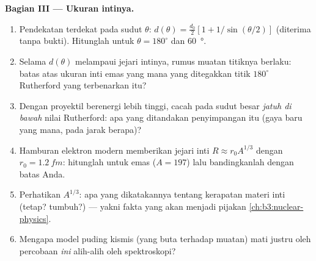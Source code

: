 \begin{problem}
\medskip\noindent\textbf{Bagian III --- Ukuran intinya.}
\begin{enumerate}[resume]
  \item Pendekatan terdekat pada sudut $\theta$: $d(\theta) =
        \tfrac{d_0}2[1 + 1/\sin(\theta/2)]$ (diterima tanpa bukti).
        Hitunglah untuk $\theta = 180^\circ$ dan \qty{60}{\degree}.
  \item Selama $d(\theta)$ melampaui jejari intinya, rumus muatan
        titiknya berlaku: batas atas ukuran inti emas yang mana yang
        ditegakkan titik $180^\circ$ Rutherford yang terbenarkan itu?
  \item Dengan proyektil berenergi lebih tinggi, cacah pada sudut besar
        \emph{jatuh di bawah} nilai Rutherford: apa yang ditandakan
        penyimpangan itu (gaya baru yang mana, pada jarak berapa)?
  \item Hamburan elektron modern memberikan jejari inti $R
        \approx r_0A^{1/3}$ dengan $r_0 = \qty{1.2}{fm}$: hitunglah
        untuk emas ($A = 197$) lalu bandingkanlah dengan batas Anda.
  \item Perhatikan $A^{1/3}$: apa yang dikatakannya tentang kerapatan
        materi inti (tetap? tumbuh?) --- yakni fakta yang akan menjadi
        pijakan \cref{ch:b3:nuclear-physics}.
  \item Mengapa model puding kismis (yang buta terhadap muatan) mati
        justru oleh percobaan \emph{ini} alih-alih oleh spektroskopi?
\end{enumerate}


\end{problem}
